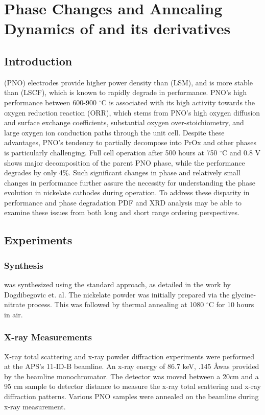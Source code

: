 \graphicspath{{./pno/figures/}}
\chapter{Phase Changes and Annealing Dynamics of  and its derivatives} \label{ch:pno}
\section{Introduction}
 (PNO) electrodes provide higher power density than  (LSM), and is more stable than  (LSCF), which is known to rapidly degrade in performance. \cite{Zhou2012}
PNO's high performance between 600-900 $^\circ$C is associated with its high activity towards the oxygen reduction reaction (ORR), which stems from PNO's high oxygen diffusion and surface exchange coefficients, substantial oxygen over-stoichiometry, and large oxygen ion conduction paths through the unit cell. \cite{Yashima2008}
Despite these advantages, PNO's tendency to partially decompose into PrOx and other phases is particularly challenging. \cite{Dogdibegovic2016}
Full cell operation after 500 hours at 750 $^\circ$C and 0.8 V shows major decomposition of the parent PNO phase, while the performance degrades by only 4\%.
Such significant changes in phase and relatively small changes in performance further assure the necessity for understanding the phase evolution in nickelate cathodes during operation.
To address these disparity in performance and phase degradation PDF and XRD analysis may be able to examine these issues from both long and short range ordering perspectives.

\section{Experiments}
\subsection{ Synthesis}
 was synthesized using the standard approach, as detailed in the work by Dogdibegovic et. al. \cite{Dogdibegovic2016}
The nickelate powder was initially prepared via the glycine-nitrate process.
This was followed by thermal annealing at 1080 $^\circ$C for 10 hours in air.

\subsection{X-ray Measurements}
X-ray total scattering and x-ray powder diffraction experiments were performed at the APS's 11-ID-B beamline.
An x-ray energy of 86.7 keV, .145 \AA was provided by the beamline monochromator.
The detector was moved between a 20cm and a 95 cm sample to detector distance to measure the x-ray total scattering and x-ray diffraction patterns.
Various PNO samples were annealed on the beamline during x-ray measurement.
